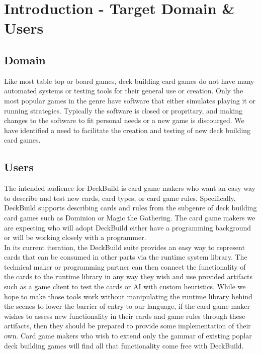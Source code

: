

\section{Introduction - Target Domain \& Users} \label{sec:intro}
\subsection{Domain}
Like most table top or board games, deck building card games do not have many automated systems or
testing tools for their general use or creation. Only the most popular games in the genre have software that
either simulates playing it or running strategies. Typically the software is closed or propritary, and
making changes to the software to fit personal needs or a new game is discourged. We have identified a need
to facilitate the creation and testing of new deck building card games.
\subsection{Users}
The intended audience for DeckBuild is card game makers who want
an easy way to describe and test new cards, card types, or card game rules. Specifically, DeckBuild
supports describing cards and rules from the subgenre of deck building card games such as Dominion or Magic the
Gathering. The card game makers we are expecting who will adopt DeckBuild either have a programming
background or will be working closely with a programmer.
\\
In its current iteration, the DeckBuild
suite provides an easy way to represent cards that can be consumed in other parts via the runtime system
library. The technical maker or programming partner can then connect the functionality of the cards to
the runtime library in any way they wish and use provided artifacts such as a game client to test the cards
or AI with custom heuristics. While we hope to make those tools work without manipulating the
runtime library behind the scenes to lower the barrier of entry to our language, if the card game maker
wishes to assess new functionality in their cards and game rules through these artifacts, then
they should be prepared to provide some implementation of their own. Card game makers who wish to
extend only the gammar of existing poplar deck building games will find all that functionality
come free with DeckBuild.
